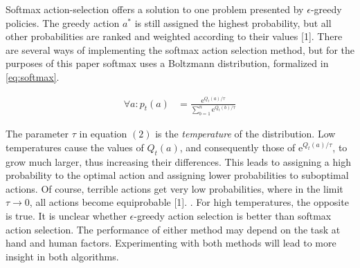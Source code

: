 \documentclass{article}
\begin{document}
Softmax action-selection offers a solution to one problem presented by $\epsilon$-greedy policies. The greedy action $a^*$ is still assigned the highest probability, but all other probabilities are ranked and weighted according to their values [1]. There are several ways of implementing the softmax action selection method, but for the purposes of this paper softmax uses a Boltzmann distribution, formalized in \ref{eq:softmax}.
\begin{mdframed}
\begin{align}
\forall a: p_t(a) &= \frac{\text{e}^{Q_t(a)/\tau}}{\sum^n_{b=1}\text{e}^{Q_t(b)/\tau}} \label{eq:softmax}
\end{align}
\end{mdframed}
The parameter $\tau$ in equation $(2)$ is the \textit{temperature} of the distribution. Low temperatures cause the values of $Q_t(a)$, and consequently those of e$^{Q_t(a)/\tau}$, to grow much larger, thus increasing their differences. This leads to assigning a high probability to the optimal action and assigning lower probabilities to suboptimal actions. Of course, terrible actions get very low probabilities, where in the limit $\tau\rightarrow0$, all actions become equiprobable [1].
. For high temperatures, the opposite is true.
It is unclear whether $\epsilon$-greedy action selection is better than softmax action selection. The performance of either method may depend on the task at hand and human factors. Experimenting with both methods will lead to more insight in both algorithms.
\pagebreak
\end{document}
